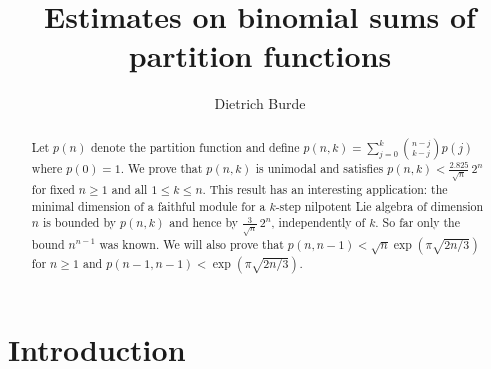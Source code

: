 \documentclass[12pt]{amsart}
\theoremstyle{definition}
\theoremstyle{remark}
\begin{document}
\title[Binomial sums of Partition functions]{Estimates on binomial sums 
of partition functions} 

\author[D. Burde]{Dietrich Burde}
\address{Mathematisches Institut\\
  Heinrich-Heine-Universit\"at\\
  Universit\"atsstr. 1\\
  40225 D\"us\-sel\-dorf\\
  Germany}


\begin{abstract}
Let $p(n)$ denote the partition function and define 
$p(n,k)=\sum_{j=0}^{k}\binom{n-j}{k-j}p(j)$ where $p(0)=1$.
We prove that $p(n,k)$ is unimodal and satisfies 
$p(n,k) < \frac{2.825}{\sqrt{n}}\, 2^n $ for fixed $n\ge 1$ and all 
$1\le k\le n$.
This result has an interesting application:
the minimal dimension of a faithful module for a $k$-step nilpotent Lie
algebra of dimension $n$ is bounded by $p(n,k)$ and hence by
$\frac{3}{\sqrt{n}}\, 2^n $, independently of $k$.
So far only the bound $n^{n-1}$ was known.
We will also prove that
$p(n,n-1)<\sqrt{n}\exp(\pi\sqrt{2n/3})$ for $n\ge 1$ and
$p(n-1,n-1)<\exp (\pi\sqrt{2n/3} )$.
\end{abstract}

\maketitle

\section{Introduction}
\end{document}
